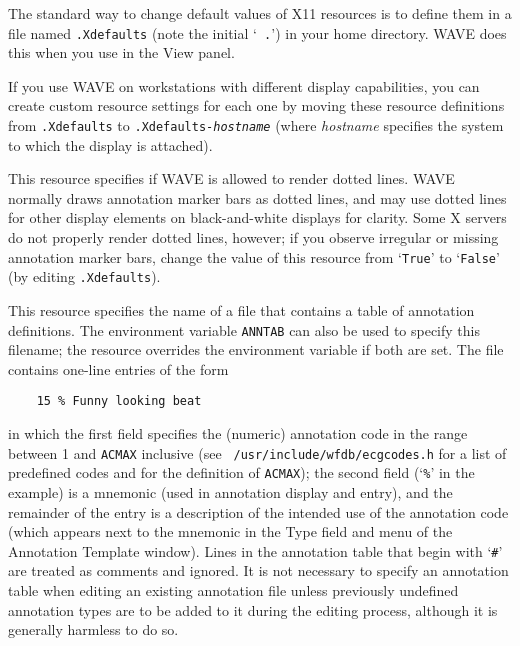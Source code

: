 \documentclass[twoside]{book}
\newcommand{\button}[1]{\cornersize{2}\ovalbox{\rule[-.3mm]{0cm}{2.5mm}\small\sf ~#1~}}
\newcommand{\WAVE}{{\sf WAVE}\xspace}
\begin{document}
The standard way to change default values of X11 resources is to
define them in a file named {\tt .Xdefaults} (note the initial `{\tt
.}') in your home directory.  \WAVE{} does this when you use
\button{Save as new defaults} in the {\sf View} panel.

If you use \WAVE{} on workstations with different display capabilities, you can
create custom resource settings for each one by moving these resource
definitions from {\tt .Xdefaults} to {\tt .Xdefaults-{\it hostname}} (where
{\it hostname} specifies the system to which the display is attached).

\begin{description}

\item[{\tt Wave.AllowDottedLines}]
This resource specifies if \WAVE{} is allowed to render dotted lines.  \WAVE{}
normally draws annotation marker bars as dotted lines, and may use dotted
lines for other display elements on black-and-white displays for clarity.
Some X servers do not properly render dotted lines, however;  if you
observe irregular or missing annotation marker bars, change the value of
this resource from `{\tt True}' to `{\tt False}' (by editing {\tt .Xdefaults}).

\label{anntab}
\item[{\tt Wave.Anntab}]
This resource specifies the name of a file that contains a table of
annotation definitions.  The environment variable {\tt ANNTAB} can also be used
to specify this filename;  the resource overrides the environment variable
if both are set.  The file contains one-line entries of the form
\begin{verbatim}
    15 % Funny looking beat
\end{verbatim}
in which the first field specifies the (numeric) annotation code in
the range between 1 and {\tt ACMAX} inclusive (see {\tt
/usr/include/wfdb/ecgcodes.h} for a list of predefined codes and for
the definition of {\tt ACMAX}); the second field (`{\tt \%}' in the
example) is a mnemonic (used in annotation display and entry), and the
remainder of the entry is a description of the intended use of the
annotation code (which appears next to the mnemonic in the {\sf Type}
field and menu of the {\sf Annotation Template} window).  Lines in the
annotation table that begin with `{\tt \#}' are treated as comments
and ignored.  It is not necessary to specify an annotation table when
editing an existing annotation file unless previously undefined
annotation types are to be added to it during the editing process,
although it is generally harmless to do so.


\end{description}
\end{document}
